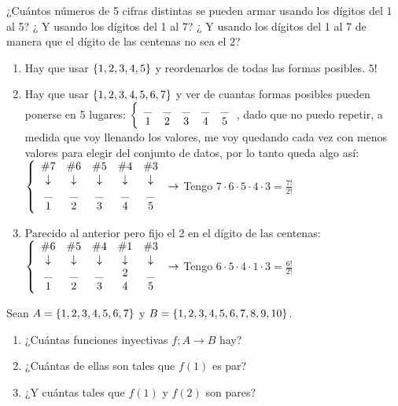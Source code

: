 \ejercicio
¿Cuántos números de 5 cifras distintas se pueden armar usando los dígitos del 1 al 5?
¿ Y usando los dígitos del 1 al 7? ¿ Y usando los dígitos del 1 al 7 de manera que el dígito de las centenas no sea el 2?
\begin{enumerate}[label=\arabic*)]
	\item Hay que usar $\set{1,2,3,4,5}$ y reordenarlos de todas las formas posibles. $5!$

	\item Hay que usar $\set{1,2,3,4,5,6,7}$ y ver de cuantas formas posibles pueden ponerse en 5 lugares:
	      $\llave{c c c c c}{
			      \_ & \_ & \_& \_& \_ \\
			      1 & 2 &3 &4 &5
		      }$, dado que no puedo repetir, a medida que voy llenando los valores, me voy quedando cada vez con menos valores
	      para elegir del conjunto de datos, por lo tanto queda algo así:
	      $\llave{c c c c c}{
			      \#7 & \#6 & \#5 & \#4 &\#3 \\
			      \downarrow &\downarrow &\downarrow &\downarrow &\downarrow\\
			      \_ & \_ & \_& \_& \_ \\
			      1 & 2 &3 &4 &5
		      }\to$ Tengo $7 \cdot 6 \cdot 5 \cdot 4 \cdot 3 = \frac{7!}{2!} $ 

	\item Parecido al anterior pero fijo el 2 en el dígito de las centenas:\\
	      $\llave{c c c c c}{
			      \#6 & \#5 & \#4 & \#1 &\#3 \\
			      \downarrow &\downarrow &\downarrow &\downarrow &\downarrow\\
			      \_ & \_ & \_& 2 & \_ \\
			      1 & 2 &3 &4 &5
		      }
		      \to $ Tengo $6 \cdot 5 \cdot 4 \cdot 1 \cdot 3 = \frac{6!}{2!} $ 
\end{enumerate}

\ejercicio
Sean $A = \set{1,2,3,4,5,6,7}$ y $B = \set{1,2,3,4,5,6,7,8,9,10}$.
\begin{enumerate}[label=\roman*)]
	\item ¿Cuántas funciones inyectivas $f; A \to B$ hay?
	\item ¿Cuántas de ellas son tales que $f(1)$ es par?
	\item ¿Y cuántas tales que $f(1)$ y $f(2)$ son pares?
\end{enumerate}

\separadorCorto

